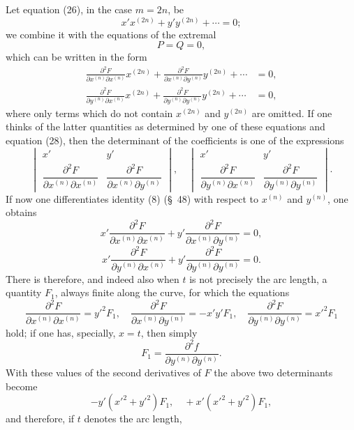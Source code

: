 \documentclass[11pt,a4paper,leqno]{article}
\begin{document}
Let equation (26), in the case $m=2n$, be
\begin{equation}\tag{28}
x'x^{(2n)}+y'y^{(2n)}+\cdots=0;
\end{equation}
we combine it with the equations of the extremal
\[
P=Q=0,
\]
which can be written in the form
\begin{equation}\tag{29}
\begin{aligned}
\frac{\partial^2F}{\partial x^{(n)}\partial x^{(n)}}x^{(2n)}
+\frac{\partial^2F}{\partial x^{(n)}\partial y^{(n)}}y^{(2n)}+\cdots&=0,\\
\frac{\partial^2F}{\partial y^{(n)}\partial x^{(n)}}x^{(2n)}
+\frac{\partial^2F}{\partial y^{(n)}\partial y^{(n)}}y^{(2n)}+\cdots&=0,
\end{aligned}
\end{equation}
where only terms which do not contain $x^{(2n)}$ and $y^{(2n)}$ are omitted. If one thinks of the latter quantities as determined by one of these equations and equation (28), then the determinant of the coefficients is one of the expressions
\[
\begin{vmatrix}
x'&y'\\
\dfrac{\partial^2F}{\partial x^{(n)}\partial x^{(n)}}&\dfrac{\partial^2F}{\partial x^{(n)}\partial y^{(n)}}
\end{vmatrix},\quad
\begin{vmatrix}
x'&y'\\
\dfrac{\partial^2F}{\partial y^{(n)}\partial x^{(n)}}&\dfrac{\partial^2F}{\partial y^{(n)}\partial y^{(n)}}
\end{vmatrix}.
\]
If now one differentiates identity (8) (\S~48) with respect to $x^{(n)}$ and $y^{(n)}$, one obtains
\[
x'\frac{\partial^2F}{\partial x^{(n)}\partial x^{(n)}}
+y'\frac{\partial^2F}{\partial x^{(n)}\partial y^{(n)}}=0,
\]
\[
x'\frac{\partial^2F}{\partial y^{(n)}\partial x^{(n)}}
+y'\frac{\partial^2F}{\partial y^{(n)}\partial y^{(n)}}=0.
\]
There is therefore, and indeed also when $t$ is not precisely the arc length, a quantity $F_1$, always finite along the curve, for which the equations
\[
\frac{\partial^2F}{\partial x^{(n)}\partial x^{(n)}}=y'^2F_1,
\quad
\frac{\partial^2F}{\partial x^{(n)}\partial y^{(n)}}=-x'y'F_1,
\quad
\frac{\partial^2F}{\partial y^{(n)}\partial y^{(n)}}=x'^2F_1
\]
hold; if one has, specially, $x=t$, then simply
\[
F_1=\frac{\partial^2f}{\partial y^{(n)}\partial y^{(n)}}.
\]
With these values of the second derivatives of $F$ the above two determinants become
\[
-y'(x'^2+y'^2)F_1,
\quad
+x'(x'^2+y'^2)F_1,
\]
and therefore, if $t$ denotes the arc length,
\end{document}
